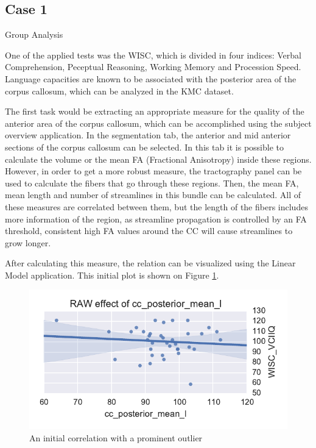 \documentclass[twocolumn]{svjour3}
\begin{document}
\subsection{Case 1}
Group Analysis

One of the applied tests was the WISC, which is divided in four indices: Verbal Comprehension, Peceptual Reasoning, Working Memory and Procession Speed. 	Language capacities are known to be associated with the posterior area of the corpus callosum, which can be analyzed in the KMC dataset. 

The first task would be extracting an appropriate measure for the quality of the anterior area of the corpus callosum, which can be accomplished using the subject overview application. In the segmentation tab, the anterior and mid anterior sections of the corpus callosum can be selected. In this tab it is possible to calculate the volume or the mean FA (Fractional Anisotropy) inside these regions. However, in order to get a more robust measure, the tractography panel can be used to calculate the fibers that go through these regions. Then, the mean FA, mean length and number of streamlines in this bundle can be calculated. All of these measures are correlated between them, but the length of the fibers includes more information of the region, as streamline propagation is controlled by an FA threshold, consistent high FA values around the CC will cause streamlines to grow longer.

After calculating this measure, the relation can be visualized using the Linear Model application. This initial plot is shown on Figure \ref{fig_lm}.

\begin{figure}
\begin{center}
\includegraphics[width=\linewidth]{figures/cases/initial_corr}
\end{center}
 \caption{\label{fig_lm}An initial correlation with a prominent outlier}
\end{figure}
\end{document}
